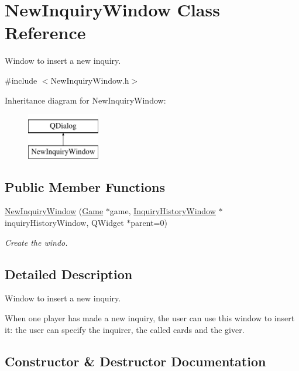 \hypertarget{classNewInquiryWindow}{}\section{New\+Inquiry\+Window Class Reference}
\label{classNewInquiryWindow}


Window to insert a new inquiry.  




{\ttfamily \#include $<$New\+Inquiry\+Window.\+h$>$}

Inheritance diagram for New\+Inquiry\+Window\+:\begin{figure}[H]
\begin{center}
\leavevmode
\includegraphics[height=2.000000cm]{classNewInquiryWindow}
\end{center}
\end{figure}
\subsection*{Public Member Functions}
\begin{DoxyCompactItemize}
\item 
\hyperlink{classNewInquiryWindow_a97d4865cb01ce94a4b042e40dcb6156a}{New\+Inquiry\+Window} (\hyperlink{classGame}{Game} $\ast$game, \hyperlink{classInquiryHistoryWindow}{Inquiry\+History\+Window} $\ast$inquiry\+History\+Window, Q\+Widget $\ast$parent=0)
\begin{DoxyCompactList}\small\item\em Create the windo. \end{DoxyCompactList}\end{DoxyCompactItemize}


\subsection{Detailed Description}
Window to insert a new inquiry. 

When one player has made a new inquiry, the user can use this window to insert it\+: the user can specify the inquirer, the called cards and the giver. 

\subsection{Constructor \& Destructor Documentation}
\mbox{\label{classNewInquiryWindow_a97d4865cb01ce94a4b042e40dcb6156a}} 
